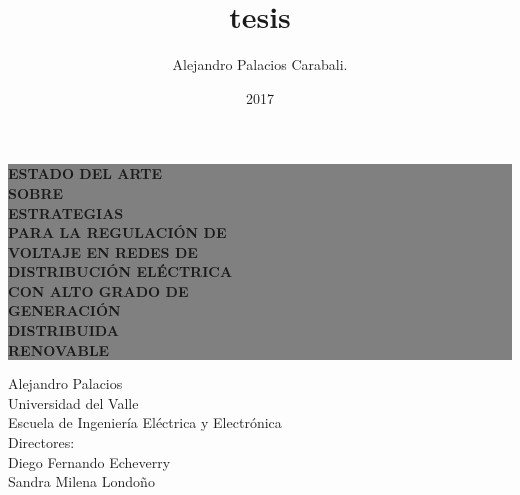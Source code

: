 \documentclass[12pt, letterpaper]{report}
\begin{document}
\title{tesis}
\author{Alejandro Palacios Carabali.}
\date{2017}
\thispagestyle{empty}%
\colorbox{grey}{
	\parbox[t]{1.0\linewidth}{
		\centering \fontsize{20pt}{30pt}\selectfont %
		\vspace*{0.7cm} %
		
		\hfill \textbf{ ESTADO DEL ARTE}\\ 
		\hfill \textbf{SOBRE }\\
		\hfill \textbf{ESTRATEGIAS }\\
		\hfill \textbf{PARA LA REGULACIÓN DE} \\
		\hfill \textbf{VOLTAJE EN REDES DE } \\ 
		\hfill \textbf{DISTRIBUCIÓN ELÉCTRICA } \\ 
		\hfill \textbf{CON ALTO GRADO DE}\\
		\hfill \textbf{GENERACIÓN }\\
		\hfill \textbf{DISTRIBUIDA }\\
		\hfill \textbf{RENOVABLE }\\
		\par
		
		\vspace*{0.7cm} %
	}
}


\vfill %


{\centering \large 
\hfill Alejandro Palacios \\
\hfill Universidad del Valle \\
\hfill Escuela de Ingeniería Eléctrica y Electrónica \\
\hfill Directores:\\
\hfill Diego Fernando Echeverry\\
\hfill Sandra Milena Londoño\\

}
\end{document}
